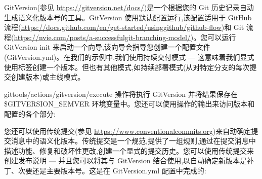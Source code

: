 

GitVersion(参见 \url{https://gitversion.net/docs/})是一个根据您的 Git 历史记录自动生成语义化版本号的工具。GitVersion 使用默认配置运行,该配置适用于 GitHub 流程(\url{https://docs.github.com/en/get-started/usinggithub/github-flow})和 Git 流程(\url{https://nvie.com/posts/a-successfulgit-branching-model/})。您可以运行 GitVersion init 来启动一个向导,该向导会指导您创建一个配置文件(GitVersion.yml)。在我们的示例中,我们使用持续交付模式 --- 这意味着我们显式使用标签创建一个版本。但也有其他模式,如持续部署模式(从对特定分支的每次提交创建版本)或主线模式。

gittools/actions/gitversion/execute 操作将执行 GitVersion 并将结果保存在 \$GITVERSION\_SEMVER 环境变量中。您还可以使用操作的输出来访问版本和配置的各个部分:



您还可以使用传统提交(参见 \url{https://www.conventionalcommits.org})来自动确定提交消息中的语义化版本。传统提交是一个规范,提供了一组规则,通过在提交消息中描述功能、修复和破坏性更改,创建一个显式的提交历史。您可以使用传统提交来创建发布说明 --- 并且您可以将其与 GitVersion 结合使用,以自动确定新版本是补丁、次要还是主要版本号。这是在 GitVersion.yml 配置中完成的:

